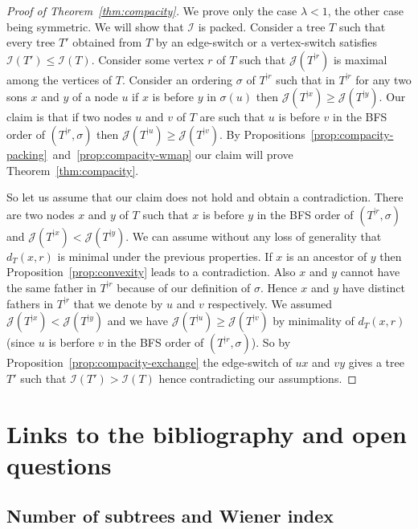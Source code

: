 \documentclass[11 pt]{modarticle}
\newcommand{\distance}[3]{d_{#3}(#1,#2)}
\newcommand{\rtree}[2]{{#1}^{\lvert #2}}
\newcommand{\ortree}[3]{(\rtree{#1}{#2},{#3})}
\newcommand{\indexsymbol}{\mathcal{I}}
\newcommand{\tindex}[1]{\indexsymbol(#1)}
\newcommand{\rindexsymbol}{\mathcal{J}}
\newcommand{\rindex}[2]{\rindexsymbol(\rtree{#2}{#1})}
\begin{document}
\begin{proof}[Proof of Theorem~\ref{thm:compacity}]
We prove only the case $\lambda < 1$, the other case being symmetric. We will show that $\indexsymbol$ is packed. Consider a tree $T$ such that every tree $T'$ obtained from $T$ by an edge-switch or a vertex-switch satisfies $\tindex{T'} \leq \tindex{T}$. Consider some vertex $r$ of $T$ such that $\rindex{r}{T}$ is maximal among the vertices of $T$. Consider an ordering $\sigma$ of $\rtree{T}{r}$ such that in $\rtree{T}{r}$ for any two sons $x$ and $y$ of a node $u$ if $x$ is before $y$ in $\sigma(u)$ then $\rindex{x}{T} \geq \rindex{y}{T}$. Our claim is that if two nodes $u$ and $v$ of $T$ are such that $u$ is before $v$ in the BFS order of $\ortree{T}{r}{\sigma}$ then $\rindex{u}{T} \geq \rindex{v}{T}$. By Propositions~\ref{prop:compacity-packing}~and~\ref{prop:compacity-wmap} our claim will prove Theorem~\ref{thm:compacity}.

So let us assume that our claim does not hold and obtain a contradiction. There are two nodes $x$ and $y$ of $T$ such that $x$ is before $y$ in the BFS order of $\ortree{T}{r}{\sigma}$ and $\rindex{x}{T} < \rindex{y}{T}$. We can assume without any loss of generality that $\distance{x}{r}{T}$ is minimal under the previous properties. If $x$ is an ancestor of $y$ then Proposition~\ref{prop:convexity} leads to a contradiction. Also $x$ and $y$ cannot have the same father in $\rtree{T}{r}$ because of our definition of $\sigma$. Hence $x$ and $y$ have distinct fathers in $\rtree{T}{r}$ that we denote by $u$ and $v$ respectively. We assumed $\rindex{x}{T} < \rindex{y}{T}$ and we have $\rindex{u}{T} \geq \rindex{v}{T}$ by minimality of $\distance{x}{r}{T}$ (since $u$ is berfore $v$ in the BFS order of $\ortree{T}{r}{\sigma}$). So by Proposition~\ref{prop:compacity-exchange} the edge-switch of $ux$ and $vy$ gives a tree $T'$ such that $\tindex{T'} > \tindex{T}$ hence contradicting our assumptions.
\end{proof}

\section{Links to the bibliography and open questions}\label{section:links}

\subsection{Number of subtrees and Wiener index}
\end{document}

